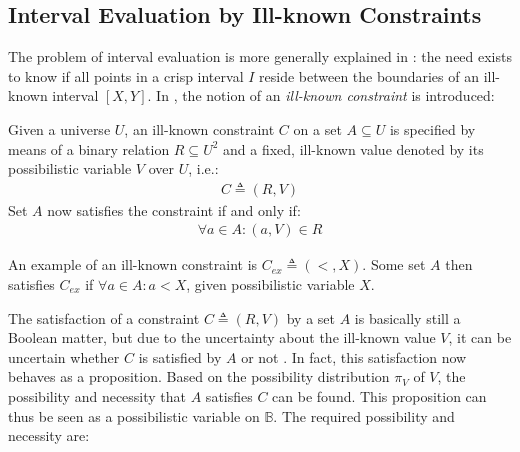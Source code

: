 %  



\subsection{Interval Evaluation by Ill-known Constraints}
The problem of interval evaluation is more generally explained in \cite{Pon11}: the need exists to know if all points in a crisp interval $I$ reside between the boundaries of an ill-known interval $\left[ X , Y \right]$. In \cite{Pon11}, the notion of an \emph{ill-known constraint} is introduced:

\begin{definition}
Given a universe $U$, an ill-known constraint $C$ on a set $A \subseteq U$ is specified by means of a binary relation $R \subseteq U^{2}$ and a fixed, ill-known value denoted by its possibilistic variable $V$ over $U$, i.e.:
\begin{align}
C \triangleq (R,V)
\end{align}
Set $A$ now satisfies the constraint if and only if:
\begin{align}
\forall a \in A : (a,V) \in R
\end{align}
\end{definition}

An example of an ill-known constraint is $C_{ex} \triangleq (<, X)$. Some set $A$ then satisfies $C_{ex}$ if $\forall a \in A : a < X$, given possibilistic variable $X$.

The satisfaction of a constraint $C \triangleq (R,V)$ by a set $A$ is basically still a Boolean matter, but due to the uncertainty about the ill-known value $V$, it can be uncertain whether $C$ is satisfied by $A$ or not \cite{Pon11}. In fact, this satisfaction now behaves as a proposition. Based on the possibility distribution $\pi_{V}$ of $V$, the possibility and necessity that $A$ satisfies $C$ can be found. This proposition can thus be seen as a possibilistic variable on $\mathbb{B}$. The required possibility and necessity are:

\vspace{-10pt}

